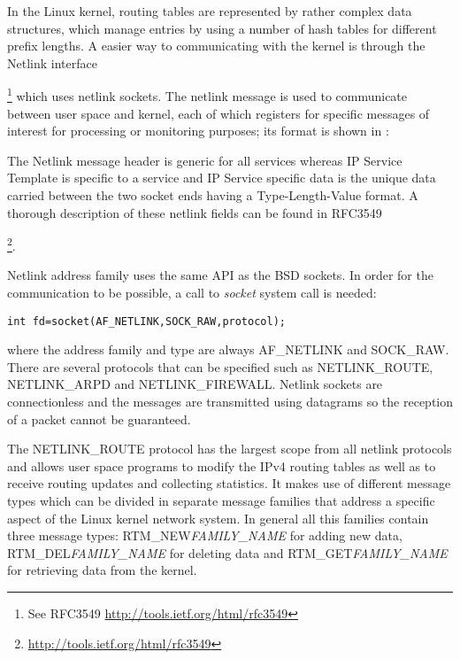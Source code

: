 In the Linux kernel, routing tables are represented by rather complex data structures, which manage entries by 
using a number of hash tables for different prefix lengths. A easier way to communicating with the kernel is 
through the Netlink interface{\footnote{See RFC3549 \url{http://tools.ietf.org/html/rfc3549}} which uses netlink sockets.
The netlink message is used to communicate between user space and kernel, each of which registers for specific 
messages of interest for processing or monitoring purposes; its format is shown in :

The Netlink message header is generic for all services whereas IP Service Template is specific to a service and 
IP Service specific data is the unique data carried between the two socket ends having a Type-Length-Value format. 
A thorough description of these netlink fields can be found in RFC3549 {\footnote{\url{http://tools.ietf.org/html/rfc3549}}.

Netlink address family uses the same API as the BSD sockets. In order for the communication to be possible, a call 
to \textit{socket} system call is needed:
\begin{lstlisting}
int fd=socket(AF_NETLINK,SOCK_RAW,protocol);
\end{lstlisting}
where the address family and type are always AF_NETLINK and SOCK_RAW. There are several protocols that can be specified 
such as NETLINK_ROUTE, NETLINK_ARPD and NETLINK_FIREWALL.
Netlink sockets are connectionless and the messages are transmitted using datagrams so the reception of a packet cannot be guaranteed.

The NETLINK_ROUTE protocol has the largest scope from all netlink protocols and allows user space programs 
to modify the IPv4 routing tables as well as to receive routing updates and collecting statistics. It makes use of 
different message types which can be divided in separate message families that address a specific aspect of the 
Linux kernel network system. In general all this families contain three message types: RTM_NEW\textit{FAMILY_NAME} 
for adding new data, RTM_DEL\textit{FAMILY_NAME} for deleting data and RTM_GET\textit{FAMILY_NAME} for retrieving data from the kernel.

}}
